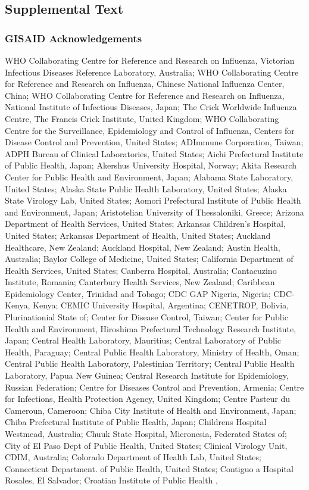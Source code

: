 \pagebreak

\subsection*{Supplemental Text}

\subsubsection*{GISAID Acknowledgements}

WHO Collaborating Centre for Reference and Research on Influenza, Victorian Infectious Diseases Reference Laboratory, Australia; WHO Collaborating Centre for Reference and Research on Influenza, Chinese National Influenza Center, China; WHO Collaborating Centre for Reference and Research on Influenza, National Institute of Infectious Diseases, Japan; The Crick Worldwide Influenza Centre, The Francis Crick Institute, United Kingdom; WHO Collaborating Centre for the Surveillance, Epidemiology and Control of Influenza, Centers for Disease Control and Prevention, United States; ADImmune Corporation, Taiwan; ADPH Bureau of Clinical Laboratories, United States; Aichi Prefectural Institute of Public Health, Japan; Akershus University Hospital, Norway; Akita Research Center for Public Health and Environment, Japan; Alabama State Laboratory, United States; Alaska State Public Health Laboratory, United States; Alaska State Virology Lab, United States; Aomori Prefectural Institute of Public Health and Environment, Japan; Aristotelian University of Thessaloniki, Greece; Arizona Department of Health Services, United States; Arkansas Children's Hospital, United States; Arkansas Department of Health, United States; Auckland Healthcare, New Zealand; Auckland Hospital, New Zealand; Austin Health, Australia; Baylor College of Medicine, United States; California Department of Health Services, United States; Canberra Hospital, Australia; Cantacuzino Institute, Romania; Canterbury Health Services, New Zealand; Caribbean Epidemiology Center, Trinidad and Tobago; CDC GAP Nigeria, Nigeria; CDC-Kenya, Kenya; CEMIC University Hospital, Argentina; CENETROP, Bolivia, Plurinationial State of; Center for Disease Control, Taiwan; Center for Public Health and Environment, Hiroshima Prefectural Technology Research Institute, Japan; Central Health Laboratory, Mauritius; Central Laboratory of Public Health, Paraguay; Central Public Health Laboratory, Ministry of Health, Oman; Central Public Health Laboratory, Palestinian Territory; Central Public Health Laboratory, Papua New Guinea; Central Research Institute for Epidemiology, Russian Federation; Centre for Diseases Control and Prevention, Armenia; Centre for Infections, Health Protection Agency, United Kingdom; Centre Pasteur du Cameroun, Cameroon; Chiba City Institute of Health and Environment, Japan; Chiba Prefectural Institute of Public Health, Japan; Childrens Hospital Westmead, Australia; Chuuk State Hospital, Micronesia, Federated States of; City of El Paso Dept of Public Health, United States; Clinical Virology Unit, CDIM, Australia; Colorado Department of Health Lab, United States; Connecticut Department. of Public Health, United States; Contiguo a Hospital Rosales, El Salvador; Croatian Institute of Public Health , 
